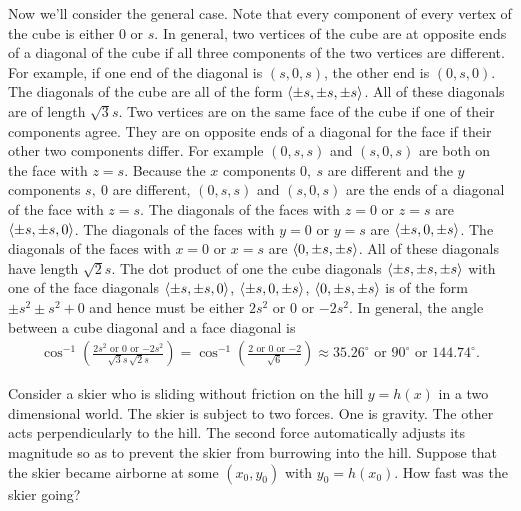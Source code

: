 \begin{solution}
Now we'll consider the general case.
Note that every component of every vertex of the cube is either $0$ or
$s$. In general, two vertices of the cube are at
opposite ends of a diagonal of the cube if all three components of the
two vertices are different. For example, if one end of the diagonal is
$(s,0,s)$, the other end is $(0,s,0)$. The diagonals of the cube are all 
of the form $\left< \pm s,\pm s,\pm s\right>$. All of these diagonals are of length $\sqrt{3}s$.
Two vertices are on the same face of the cube if one of their components
agree. They are on opposite ends of a diagonal for the face if their other
two components differ. For example $(0,s,s)$ and $(s,0,s)$ are both on
the face with $z=s$.  Because the $x$ components $0,\ s$ are different
and the $y$ components $s,\ 0$ are different, $(0,s,s)$ and $(s,0,s)$
are the ends of a diagonal of the face with $z=s$. The diagonals of the
faces with $z=0$ or $z=s$ are $\left< \pm s,\pm s,0\right>$. The diagonals of the
faces with $y=0$ or $y=s$ are $\left< \pm s,0, \pm s\right>$. The diagonals of the
faces with $x=0$ or $x=s$ are $\left< 0,\pm s,\pm s\right>$. All of these diagonals
have length $\sqrt{2}s$. The dot product of one the cube diagonals
$\left< \pm s,\pm s,\pm s\right>$ with one of the face diagonals  $\left< \pm s,\pm s,0\right>$,
 $\left< \pm s,0, \pm s\right>$, $\left< 0,\pm s,\pm s\right>$ is of the form $\pm s^2\pm s^2+0$
and hence must be either $2s^2$ or $0$ or $-2s^2$. In general, the angle
between a cube diagonal and a face diagonal is
\begin{align*}
\cos^{-1}\left(\frac{\text{$2s^2$ or 0 or $-2s^2$}}{\sqrt{3}s\,\sqrt{2}s}\right)
=\cos^{-1}\left(\frac{\text{$2$ or $0$ or $-2$}}{\sqrt{6}}\right)\approx 
\text{$35.26^\circ$ or $90^\circ$ or $144.74^\circ$}. 
\end{align*}
\end{solution}


\begin{question}
Consider a skier who is sliding without friction on the
hill $y=h(x)$ in a two dimensional world. The skier is subject to two
forces. One is gravity. The other acts perpendicularly to the hill. The second force automatically adjusts its magnitude so as to prevent the skier from burrowing into the hill. Suppose that the skier became
airborne at some $(x_0,y_0)$ with $y_0=h(x_0)$. How fast was the skier going? 

\end{question}


